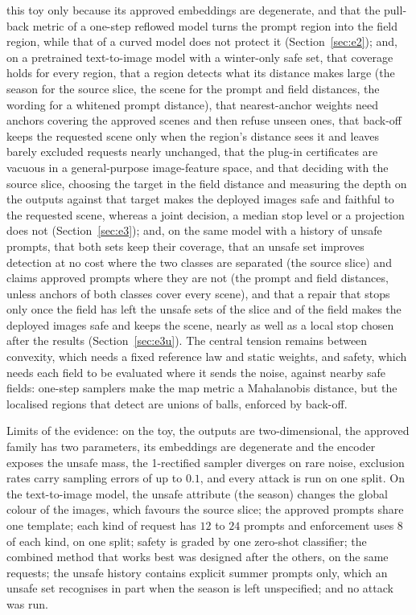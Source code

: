 \documentclass{article}
\theoremstyle{plain}
\theoremstyle{remark}
\begin{document}
this toy only because its approved embeddings are degenerate, and that the pull-back metric of a one-step reflowed model turns the
prompt region into the field region, while that of a curved model does not protect it (Section~\ref{sec:e2}); and, on a pretrained
text-to-image model with a winter-only safe set, that coverage holds for every region, that a region detects what its distance makes
large (the season for the source slice, the scene for the prompt and field distances, the wording for a whitened prompt distance),
that nearest-anchor weights need anchors covering the approved scenes and then refuse unseen ones, that back-off keeps the requested
scene only when the region's distance sees it and leaves barely excluded requests nearly unchanged, that the plug-in
certificates are vacuous in a general-purpose image-feature space, and that deciding with the source slice, choosing the target in
the field distance and measuring the depth on the outputs against that target makes the deployed images safe and faithful to the
requested scene, whereas a joint decision, a median stop level or a projection does not (Section~\ref{sec:e3}); and, on the same model
with a history of unsafe prompts, that both sets keep their coverage, that an unsafe set improves detection at no cost where the two
classes are separated (the source slice) and claims approved prompts where they are not (the prompt and field distances, unless anchors
of both classes cover every scene), and that a repair that stops only once the field has left the unsafe sets of the slice and of the
field makes the deployed images safe and keeps the scene, nearly as well as a local stop chosen after the results
(Section~\ref{sec:e3u}). The central tension
remains between convexity, which needs a fixed reference law and static weights, and safety, which needs each field to be
evaluated where it sends the noise, against nearby safe fields: one-step samplers make the map metric a Mahalanobis distance, but
the localised regions that detect are unions of balls, enforced by back-off.

Limits of the evidence: on the toy, the outputs are two-dimensional, the approved family has two parameters, its embeddings are
degenerate and the encoder exposes the unsafe mass, the 1-rectified sampler diverges on rare noise, exclusion rates carry sampling
errors of up to $0.1$, and every attack is run on one split. On the text-to-image model, the unsafe attribute (the season) changes
the global colour of the images, which favours the source slice; the approved prompts share one template; each kind of request has
$12$ to $24$ prompts and enforcement uses $8$ of each kind, on one split; safety is graded by one zero-shot classifier; the
combined method that works best was designed after the others, on the same requests; the unsafe history contains explicit summer prompts
only, which an unsafe set recognises in part when the season is left unspecified; and no attack was run.
\end{document}
